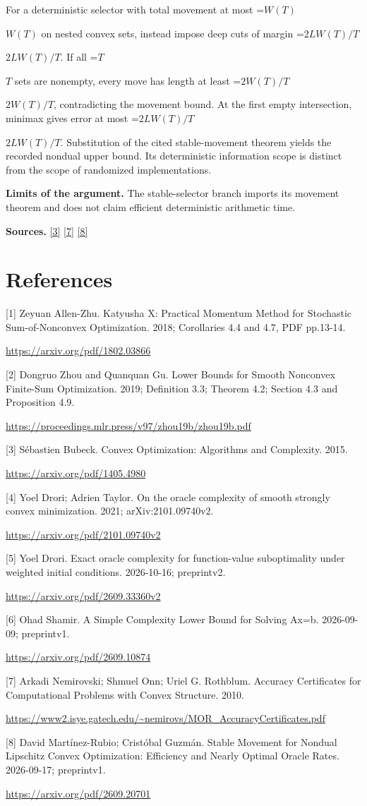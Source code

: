 \documentclass[10pt,a4paper]{article}
\newcommand{\AtlasMath}[1]{\par\begingroup\centering\setbox0=\hbox{$\displaystyle #1$}\ifdim\wd0>1.4\linewidth\typeout{ATLAS WIDE FORMULA: \the\wd0}\fi\ifdim\wd0>\linewidth\resizebox{\linewidth}{!}{\box0}\else\box0\fi\par\endgroup}
\newcommand{\AtlasInlineMath}[1]{\begingroup\setbox0=\hbox{$#1$}\ifdim\wd0>.4\linewidth\endgroup\AtlasMath{#1}\else\endgroup$#1$\fi}
\begin{document}
For a deterministic selector with total movement at most \AtlasInlineMath{W(T)} on nested convex sets, instead impose deep cuts of margin \AtlasInlineMath{2LW(T)/T}. If all \AtlasInlineMath{T} sets are nonempty, every move has length at least \AtlasInlineMath{2W(T)/T}, contradicting the movement bound. At the first empty intersection, minimax gives error at most \AtlasInlineMath{2LW(T)/T}. Substitution of the cited stable-movement theorem yields the recorded nondual upper bound. Its deterministic information scope is distinct from the scope of randomized implementations.

\textbf{Limits of the argument.} The stable-selector branch imports its movement theorem and does not claim efficient deterministic arithmetic time.

\textbf{Sources.} \href{https://arxiv.org/pdf/1405.4980}{[3]} \href{https://www2.isye.gatech.edu/~nemirovs/MOR_AccuracyCertificates.pdf}{[7]} \href{https://arxiv.org/pdf/2609.20701}{[8]}

\section{References}
[1] Zeyuan Allen-Zhu. Katyusha X: Practical Momentum Method for Stochastic Sum-of-Nonconvex Optimization. 2018; Corollaries 4.4 and 4.7, PDF pp.13-14.

\url{https://arxiv.org/pdf/1802.03866}

[2] Dongruo Zhou and Quanquan Gu. Lower Bounds for Smooth Nonconvex Finite-Sum Optimization. 2019; Definition 3.3; Theorem 4.2; Section 4.3 and Proposition 4.9.

\url{https://proceedings.mlr.press/v97/zhou19b/zhou19b.pdf}

[3] Sébastien Bubeck. Convex Optimization: Algorithms and Complexity. 2015.

\url{https://arxiv.org/pdf/1405.4980}

[4] Yoel Drori; Adrien Taylor. On the oracle complexity of smooth strongly convex minimization. 2021; arXiv:2101.09740v2.

\url{https://arxiv.org/pdf/2101.09740v2}

[5] Yoel Drori. Exact oracle complexity for function-value suboptimality under weighted initial conditions. 2026-10-16; preprintv2.

\url{https://arxiv.org/pdf/2609.33360v2}

[6] Ohad Shamir. A Simple Complexity Lower Bound for Solving Ax=b. 2026-09-09; preprintv1.

\url{https://arxiv.org/pdf/2609.10874}

[7] Arkadi Nemirovski; Shmuel Onn; Uriel G. Rothblum. Accuracy Certificates for Computational Problems with Convex Structure. 2010.

\url{https://www2.isye.gatech.edu/~nemirovs/MOR_AccuracyCertificates.pdf}

[8] David Martínez-Rubio; Cristóbal Guzmán. Stable Movement for Nondual Lipschitz Convex Optimization: Efficiency and Nearly Optimal Oracle Rates. 2026-09-17; preprintv1.

\url{https://arxiv.org/pdf/2609.20701}
\end{document}
